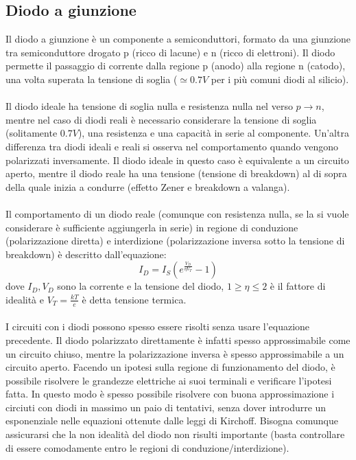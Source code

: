 \documentclass{article}
\begin{document}
\subsection{Diodo a giunzione}
Il diodo a giunzione è un componente a semiconduttori, formato da una giunzione tra semiconduttore drogato p (ricco di lacune) e n (ricco di elettroni). Il diodo permette il passaggio di corrente dalla regione p (anodo) alla regione n (catodo), una volta superata la tensione di soglia ($\simeq 0.7V$ per i più comuni diodi al silicio).\\\\
Il diodo ideale ha tensione di soglia nulla e resistenza nulla nel verso $p\rightarrow n$, mentre nel caso di diodi reali è necessario considerare la tensione di soglia (solitamente $0.7V$), una resistenza e una capacità in serie al componente. Un'altra differenza tra diodi ideali e reali si osserva nel comportamento quando vengono polarizzati inversamente. Il diodo ideale in questo caso è equivalente a un circuito aperto, mentre il diodo reale ha una tensione (tensione di breakdown) al di sopra della quale inizia a condurre (effetto Zener e breakdown a valanga).\\\\
Il comportamento di un diodo reale (comunque con resistenza nulla, se la si vuole considerare è sufficiente aggiungerla in serie) in regione di conduzione (polarizzazione diretta) e interdizione (polarizzazione inversa sotto la tensione di breakdown) è descritto dall'equazione:
$$ I_D = I_S\left( e^{\frac{V_D}{\eta V_T}} - 1 \right)$$
dove $I_D,V_D$ sono la corrente e la tensione del diodo, $1\geq\eta\leq2$ è il fattore di idealità e $V_T=\frac{kT}{e}$ è detta tensione termica.\\\\
I circuiti con i diodi possono spesso essere risolti senza usare l'equazione precedente. Il diodo polarizzato direttamente è infatti spesso approssimabile come un circuito chiuso, mentre la polarizzazione inversa è spesso approssimabile a un circuito aperto. Facendo un ipotesi sulla regione di funzionamento del diodo, è possibile risolvere le grandezze elettriche ai suoi terminali e verificare l'ipotesi fatta. In questo modo è spesso possibile risolvere con buona approssimazione i circiuti con diodi in massimo un paio di tentativi, senza dover introdurre un esponenziale nelle equazioni ottenute dalle leggi di Kirchoff. Bisogna comunque assicurarsi che la non idealità del diodo non risulti importante (basta controllare di essere comodamente entro le regioni di conduzione/interdizione).\\\\
\end{document}
